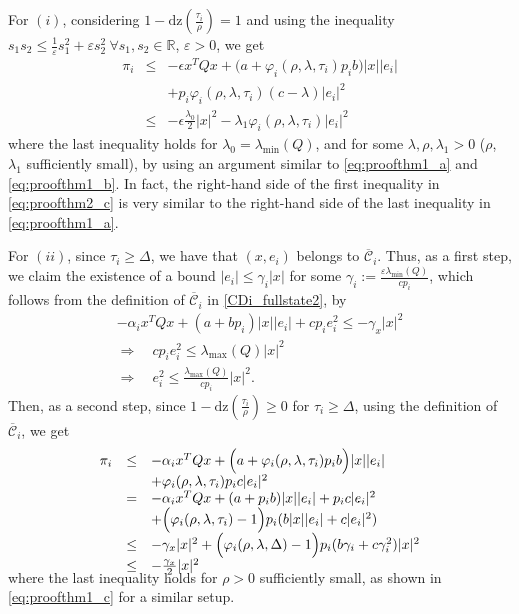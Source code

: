 \documentclass[twocolumn]{autart}
\newcommand\real{\ensuremath{{\mathbb R}}}
\newcommand\dz{\mathrm{dz}}
\begin{document}
For $(i)$, 
considering  $1-\dz(\frac{\tau_i}{\rho})=1$ and using the inequality
$s_1s_2 \leq \frac{1}{\varepsilon}s_1^2 + \varepsilon s_2^2 \ 
\forall s_1,s_2\in\real$, $\varepsilon>0$, we get
\begin{equation}
\label{eq:proofthm2_c}
\begin{array}{lll}
\pi_i 
&\leq& 
-\epsilon x^TQx 
+ \Big(a+\varphi_i(\rho,\lambda,\tau_i)p_ib\Big)|x||e_i|  \\
& &+ p_i\varphi_i(\rho,\lambda,\tau_i) 
(c- \lambda ) |e_i|^2 \\
&\leq&
-\epsilon\frac{\lambda_0}{2}|x|^2 -\lambda_1 \varphi_i(\rho,\lambda,\tau_i) |e_i|^2\
\end{array} 
\end{equation}
where the last inequality holds for $\lambda_0= \lambda_{\min}(Q)$,
and for some $\lambda,\rho,\lambda_1>0$ ($\rho$, $\lambda_1$ sufficiently small),
by using an argument similar to
\eqref{eq:proofthm1_a} and \eqref{eq:proofthm1_b}.
In fact, the right-hand side of the first inequality in 
\eqref{eq:proofthm2_c} is very similar to 
the right-hand side of the last inequality in \eqref{eq:proofthm1_a}.

For $(ii)$, since $\tau_i\geq \Delta$, we have that
$(x,e_i)$ belongs to $\overline{\mathcal{C}}_i$. Thus,
as a first step, we claim the existence of a bound 
$|e_i|\leq \gamma_i|x|$ for some 
$\gamma_i:= \frac{\varepsilon \lambda_{\min}(Q)}{c p_i}$, 
which follows from 
the definition of $\overline{\mathcal{C}}_i$ in 
\eqref{CDi_fullstate2}, by
\begin{equation}
\label{eq:proofthm2_d}
\begin{array}{l}
 -\! \alpha_ix^TQx \!+\!  (a\!+\!bp_i) |x||e_i| \!+\! cp_ie_i^2 \leq -\gamma_x|x|^2 \\
\Rightarrow  \quad
cp_i e_i^2  
\!\leq\! \lambda_{\max}(Q)|x|^2 \\
\Rightarrow  \quad
e_i^2 \leq \frac{ \lambda_{\max}(Q)}{c p_i} |x|^2.
\end{array}
\end{equation}
Then, as a second step, since $1-\dz(\frac{\tau_i}{\rho})\geq 0$
for $\tau_i\geq \Delta$, 
using the definition of $\overline{\mathcal{C}}_i$, we get 
\begin{equation}
\begin{array}{lll}
\label{eq:proofthm2_e}
\pi_i 
&\leq& 
-\alpha_i x^TQx + \Big(a+\varphi_i(\rho,\lambda,\tau_i)p_ib\Big)|x||e_i|  \\
& & + \varphi_i(\rho,\lambda,\tau_i)p_i c |e_i|^2 \\
&=& 
-\alpha_i x^TQx + (a+p_ib)|x||e_i| + p_i c|e_i|^2  \\
& & 
+\Big(\varphi_i(\rho,\lambda,\tau_i)-1\Big)p_i (b|x||e_i| + c|e_i|^2) \\
&\leq & -\gamma_x|x|^2 
+\Big(\varphi_i(\rho,\lambda,\Delta)-1\Big)p_i (b\gamma_i + c\gamma_i^2)|x|^2  \\
&\leq & -\frac{\gamma_x}{2}|x|^2 \vspace{-4mm}
\end{array} \vspace{1mm}
\end{equation}
where the last inequality holds for $\rho>0$ sufficiently small, 
as shown in \eqref{eq:proofthm1_c} for a similar setup.
\end{document}
